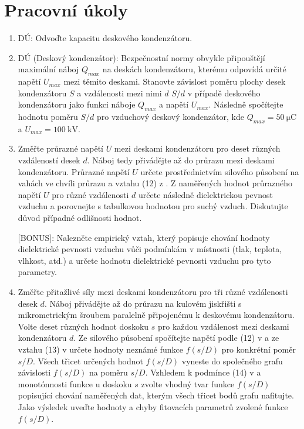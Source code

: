 \documentclass[english]{article}
\begin{document}


\setlength{\parindent}{0.5cm}
\section{Pracovní úkoly}
\begin{enumerate}
\item DÚ: Odvoďte kapacitu deskového kondenzátoru.
\item DÚ (Deskový kondenzátor): Bezpečnostní normy obvykle připouštějí maximální náboj $Q_{max}$ na deskách kondenzátoru, kterému odpovídá určité napětí $U_{max}$ mezi těmito deskami. Stanovte závislost poměru plochy desek kondenzátoru $S$ a vzdálenosti mezi nimi $d$ ${S}/{d}$ v případě deskového kondenzátoru jako funkci náboje $Q_{max}$ a napětí $U_{max}$. Následně spočítejte hodnotu poměru ${S}/{d}$ pro vzduchový deskový kondenzátor, kde $Q_{max} = 50~\mathrm{\mu C}$
a $U_{max} = 100~\mathrm{kV}$. 

\item Změřte průrazné napětí $U$ mezi deskami kondenzátoru pro deset různých vzdáleností desek $d$. Náboj tedy přivádějte až do průrazu mezi deskami kondenzátoru. Průrazné napětí $U$ určete prostřednictvím silového působení na
vahách ve chvíli průrazu a vztahu (12) z \cite{bib:zadani}. Z naměřených hodnot průrazného napětí $U$ pro různé vzdálenosti $d$ určete
následně dielektrickou pevnost vzduchu a porovnejte s tabulkovou hodnotou pro suchý vzduch. Diskutujte důvod případné odlišnosti hodnot.

[BONUS]: Nalezněte empirický vztah, který popisuje chování hodnoty dielektrické pevnosti vzduchu vůči podmínkám v místnosti (tlak, teplota, vlhkost, atd.) a určete hodnotu dielektrické pevnosti vzduchu pro tyto parametry.

\item Změřte přitažlivé síly mezi deskami kondenzátoru pro tři různé vzdálenosti desek $d$. Náboj přivádějte až do průrazu na kulovém jiskřišti s mikrometrickým šroubem paralelně připojenému k deskovému kondenzátoru. Volte deset různých hodnot doskoku $s$ pro každou vzdálenost mezi deskami kondenzátoru $d$. Ze silového působení spočítejte napětí podle (12) v \cite{bib:zadani} a ze vztahu (13) v \cite{bib:zadani} určete hodnoty neznámé funkce $f(s/D)$ pro konkrétní poměr $s/D$. Všech třicet určených hodnot $f(s/D)$ vyneste do společného grafu závislosti $f(s/D)$ na poměru $s/D$. Vzhledem k podmínce (14) v \cite{bib:zadani} a monotónnosti funkce u doskoku $s$ zvolte vhodný tvar funkce $f(s/D)$ popisující chování naměřených dat, kterým všech třicet bodů grafu nafitujte. Jako výsledek uveďte hodnoty a chyby fitovacích parametrů zvolené funkce $f(s/D)$.


\end{enumerate}
\end{document}

